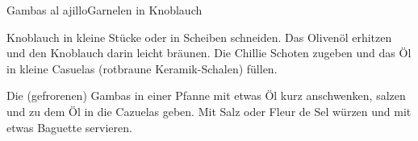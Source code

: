\begin{recipe}{Gambas al ajillo}{Garnelen in Knoblauch}
  \label{Gambas al ajillo}
  \inglist

  \steps
  Knoblauch in kleine Stücke oder in Scheiben schneiden. Das Olivenöl erhitzen und den
  Knoblauch darin leicht bräunen. Die Chillie Schoten zugeben und das Öl in kleine
  Casuelas (rotbraune Keramik-Schalen) füllen.

  Die (gefrorenen) Gambas in einer Pfanne mit etwas Öl kurz anschwenken, salzen und zu dem
  Öl in die Cazuelas geben. Mit Salz oder Fleur de Sel würzen und mit etwas Baguette
  servieren.
\end{recipe}
